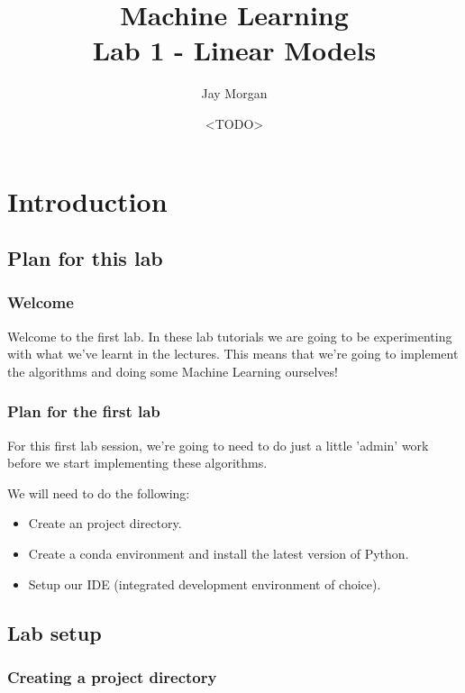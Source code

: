 \documentclass[10pt]{beamer}
\author{Jay Morgan}
\date{<TODO>}
\title{Machine Learning\\\medskip
\large Lab 1 - Linear Models}
\begin{document}
\maketitle

\section*{Introduction}
\label{sec:org62f0ee8}

\subsection*{Plan for this lab}
\label{sec:org210c2db}

\subsubsection*{Welcome}
\label{sec:org7ddf871}

Welcome to the first lab. In these lab tutorials we are going to be experimenting
with what we've learnt in the lectures. This means that we're going to implement the
algorithms and doing some Machine Learning ourselves!

\subsubsection*{Plan for the first lab}
\label{sec:orgb545ac0}

For this first lab session, we're going to need to do just a little 'admin' work
before we start implementing these algorithms.

We will need to do the following:
\begin{itemize}
\item Create an project directory.
\item Create a conda environment and install the latest version of Python.
\item Setup our IDE (integrated development environment of choice).
\end{itemize}

\subsection*{Lab setup}
\label{sec:org46b5c9b}

\subsubsection*{Creating a project directory}
\label{sec:org4eca51e}
\end{document}
